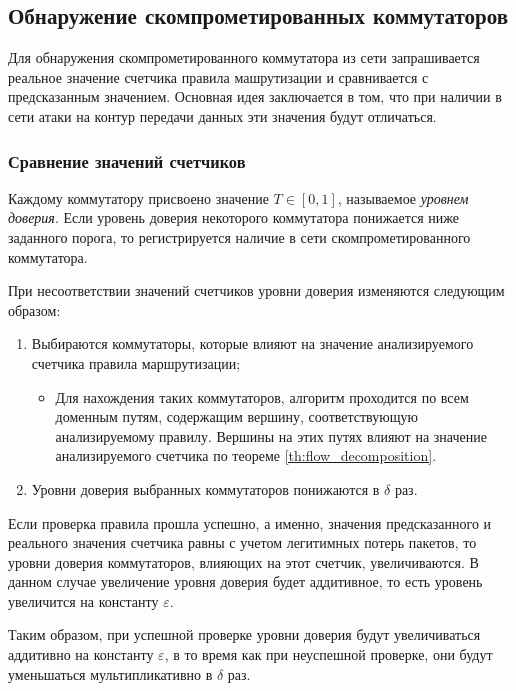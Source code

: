 \documentclass[../thesis.tex]{subfiles}
\begin{document}
\subsection{Обнаружение скомпрометированных коммутаторов}

Для обнаружения скомпрометированного коммутатора из сети запрашивается реальное значение счетчика правила машрутизации и сравнивается с предсказанным значением.
Основная идея заключается в том, что при наличии в сети атаки на контур передачи данных эти значения будут отличаться.

\subsubsection{Сравнение значений счетчиков}

Каждому коммутатору присвоено значение $T\in [0,1]$, называемое \textit{уровнем доверия}.
Если уровень доверия некоторого коммутатора понижается ниже заданного порога, то регистрируется наличие в сети скомпрометированного коммутатора.

При несоответствии значений счетчиков уровни доверия изменяются следующим образом:
\begin{enumerate}
\item Выбираются коммутаторы, которые влияют на значение анализируемого счетчика правила маршрутизации;
    \begin{itemize}
    \item Для нахождения таких коммутаторов, алгоритм проходится по всем доменным путям, содержащим вершину, соответствующую анализируемому правилу.
    Вершины на этих путях влияют на значение анализируемого счетчика по теореме \ref{th:flow_decomposition}.
    \end{itemize}
\item Уровни доверия выбранных коммутаторов понижаются в $\delta$ раз.
\end{enumerate}

Если проверка правила прошла успешно, а именно, значения предсказанного и реального значения счетчика равны с учетом легитимных потерь пакетов, то уровни доверия коммутаторов, влияющих на этот счетчик, увеличиваются.
В данном случае увеличение уровня доверия будет аддитивное, то есть уровень увеличится на константу $\varepsilon$.

Таким образом, при успешной проверке уровни доверия будут увеличиваться аддитивно на константу $\varepsilon$, в то время как при неуспешной проверке, они будут уменьшаться мультипликативно в $\delta$ раз.
\end{document}
